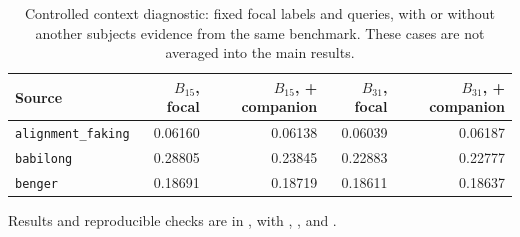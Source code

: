 \begin{table}[H]
\centering\small
\begin{tabular}{lrrrr}
\toprule
Source & $B_{15}$, focal & $B_{15}$, + companion & $B_{31}$, focal & $B_{31}$, + companion\\
\midrule
\texttt{alignment\_faking} & 0.06160 & 0.06138 & 0.06039 & 0.06187\\
\texttt{babilong} & 0.28805 & 0.23845 & 0.22883 & 0.22777\\
\texttt{benger} & 0.18691 & 0.18719 & 0.18611 & 0.18637\\
\bottomrule
\end{tabular}
\vspace{6pt}
\caption{Controlled context diagnostic: fixed focal labels and queries, with or without another subject\textquotesingle s evidence from the same benchmark. These cases are not averaged into the main results.}
\label{tab:context_audit}
\end{table}

Results and reproducible checks are in , with , , and .
